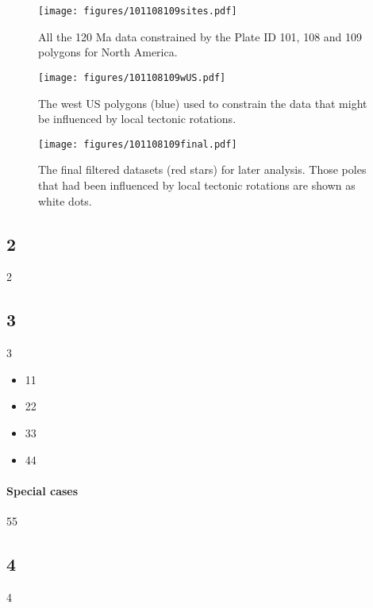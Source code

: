 \begin{figure}
\texttt{[image: figures/101108109sites.pdf]}
\caption{All the 120 Ma data constrained by the Plate ID 101, 108
and 109 polygons for North America.}\label{fig_NApmdata}
\end{figure}

\begin{figure}
\texttt{[image: figures/101108109wUS.pdf]}
\caption{The west US polygons (blue) used to constrain the data that might be
  influenced by local tectonic rotations.}\label{fig_NAwUS}
\end{figure}

\begin{figure}
\texttt{[image: figures/101108109final.pdf]}
\caption{The final filtered datasets (red stars) for later analysis. Those
poles that had been influenced by local tectonic rotations are shown as white
dots.}\label{fig_NAfinal}
\end{figure}

\subsection{2}
2

\subsection{3}
3

\begin{itemize}
\item 11
\item 22
\item 33
\item 44
\end{itemize}

\paragraph{Special cases} 55

\subsection{4}
4

